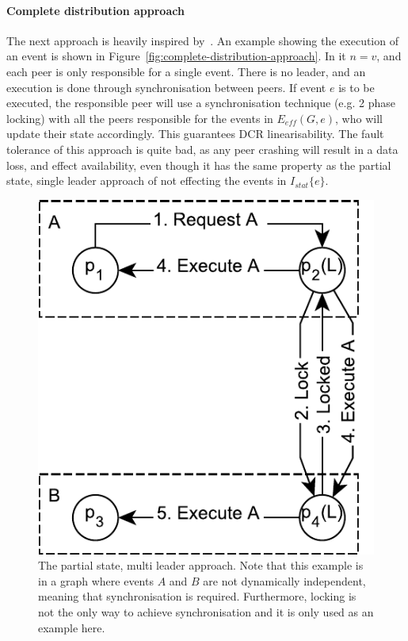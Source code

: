 \documentclass{article}
\begin{document}
	\paragraph{Complete distribution approach}
	The next approach is heavily inspired by~\cite{hildebrandt_safe_2011}.
    An example showing the execution of an event is shown in Figure~\ref{fig:complete-distribution-approach}.
	In it $n = v$, and each peer is only responsible for a single event.
	There is no leader, and an execution is done through synchronisation between peers.
	If event $e$ is to be executed, the responsible peer will use a synchronisation technique (e.g. 2 phase locking) with all the peers responsible for the events in $E_{eff}(G,e)$, who will update their state accordingly.
	This guarantees DCR linearisability.
	The fault tolerance of this approach is quite bad, as any peer crashing will result in a data loss, and effect availability, even though it has the same property as the partial state, single leader approach of not effecting the events in $I_{stat}\{e\}$.

    \FloatBarrier
    \begin{figure}[ht!]
        \center
        \includegraphics[scale=0.6]{figures/dcr-graphs/partial-state-multi-leader-approach.pdf}
        \caption{The partial state, multi leader approach.
        Note that this example is in a graph where events $A$ and $B$ are not dynamically independent, meaning that synchronisation is required.
        Furthermore, locking is not the only way to achieve synchronisation and it is only used as an example here. }
        \label{fig:partial-state-multi-leader-approach}
    \end{figure}
    \FloatBarrier
\end{document}
